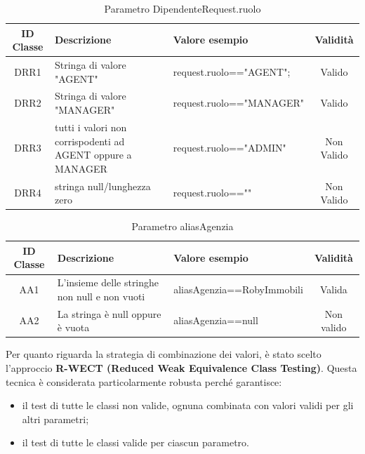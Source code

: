 \begin{table}[H]
	\centering
	\begin{tabular}{|c|p{4cm}|p{5.5cm}|c|} 
		\hline
		\textbf{ID Classe} & \textbf{Descrizione} & \textbf{Valore esempio} & \textbf{Validità} \\
		\hline
		DRR1 & Stringa di valore "AGENT"
		& request.ruolo=="AGENT"; & Valido \\
		\hline
		DRR2 & Stringa di valore "MANAGER"
		& request.ruolo=="MANAGER" & Valido \\
		\hline
		DRR3 & tutti i valori non corrispodenti ad AGENT oppure a MANAGER
		& request.ruolo=="ADMIN" & Non Valido \\
		\hline
		DRR4 & stringa null/lunghezza zero
		& request.ruolo=="" & Non Valido \\
		\hline
	\end{tabular}
	\caption{Parametro DipendenteRequest.ruolo}
	\label{tab:parametriDipendenteRequestRuolo}
\end{table}

\begin{table}[H]
	\centering
	\begin{tabular}{|c|p{4cm}|p{5.5cm}|c|} 
		\hline
		\textbf{ID Classe} & \textbf{Descrizione} & \textbf{Valore esempio} & \textbf{Validità} \\
		\hline
		AA1 & L'insieme delle stringhe non null e non vuoti & aliasAgenzia==RobyImmobili & Valida \\
		\hline
		AA2 & La stringa è null oppure è vuota & aliasAgenzia==null & Non valido \\
		\hline
	\end{tabular}
	\caption{Parametro aliasAgenzia}
	\label{tab:parametriAliasAgenzia}
\end{table}

\vspace{1cm}

Per quanto riguarda la strategia di combinazione dei valori, è stato scelto l’approccio \textbf{R-WECT (Reduced Weak Equivalence Class Testing)}. Questa tecnica è considerata particolarmente robusta perché garantisce:

\begin{itemize}
	\item il test di tutte le classi non valide, ognuna combinata con valori validi per gli altri parametri;
	\item il test di tutte le classi valide per ciascun parametro.
\end{itemize}

